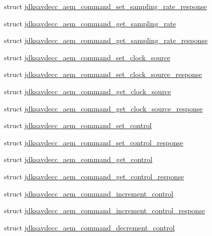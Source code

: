 \begin{DoxyCompactItemize}
\item 
struct \hyperlink{structjdksavdecc__aem__command__set__sampling__rate__response}{jdksavdecc\+\_\+aem\+\_\+command\+\_\+set\+\_\+sampling\+\_\+rate\+\_\+response}
\item 
struct \hyperlink{structjdksavdecc__aem__command__get__sampling__rate}{jdksavdecc\+\_\+aem\+\_\+command\+\_\+get\+\_\+sampling\+\_\+rate}
\item 
struct \hyperlink{structjdksavdecc__aem__command__get__sampling__rate__response}{jdksavdecc\+\_\+aem\+\_\+command\+\_\+get\+\_\+sampling\+\_\+rate\+\_\+response}
\item 
struct \hyperlink{structjdksavdecc__aem__command__set__clock__source}{jdksavdecc\+\_\+aem\+\_\+command\+\_\+set\+\_\+clock\+\_\+source}
\item 
struct \hyperlink{structjdksavdecc__aem__command__set__clock__source__response}{jdksavdecc\+\_\+aem\+\_\+command\+\_\+set\+\_\+clock\+\_\+source\+\_\+response}
\item 
struct \hyperlink{structjdksavdecc__aem__command__get__clock__source}{jdksavdecc\+\_\+aem\+\_\+command\+\_\+get\+\_\+clock\+\_\+source}
\item 
struct \hyperlink{structjdksavdecc__aem__command__get__clock__source__response}{jdksavdecc\+\_\+aem\+\_\+command\+\_\+get\+\_\+clock\+\_\+source\+\_\+response}
\item 
struct \hyperlink{structjdksavdecc__aem__command__set__control}{jdksavdecc\+\_\+aem\+\_\+command\+\_\+set\+\_\+control}
\item 
struct \hyperlink{structjdksavdecc__aem__command__set__control__response}{jdksavdecc\+\_\+aem\+\_\+command\+\_\+set\+\_\+control\+\_\+response}
\item 
struct \hyperlink{structjdksavdecc__aem__command__get__control}{jdksavdecc\+\_\+aem\+\_\+command\+\_\+get\+\_\+control}
\item 
struct \hyperlink{structjdksavdecc__aem__command__get__control__response}{jdksavdecc\+\_\+aem\+\_\+command\+\_\+get\+\_\+control\+\_\+response}
\item 
struct \hyperlink{structjdksavdecc__aem__command__increment__control}{jdksavdecc\+\_\+aem\+\_\+command\+\_\+increment\+\_\+control}
\item 
struct \hyperlink{structjdksavdecc__aem__command__increment__control__response}{jdksavdecc\+\_\+aem\+\_\+command\+\_\+increment\+\_\+control\+\_\+response}
\item 
struct \hyperlink{structjdksavdecc__aem__command__decrement__control}{jdksavdecc\+\_\+aem\+\_\+command\+\_\+decrement\+\_\+control}

\end{DoxyCompactItemize}
